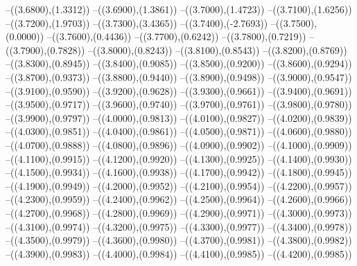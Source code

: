 {	--({\sx*(3.6800)},{\sy*(1.3312)})
	--({\sx*(3.6900)},{\sy*(1.3861)})
	--({\sx*(3.7000)},{\sy*(1.4723)})
	--({\sx*(3.7100)},{\sy*(1.6256)})
	--({\sx*(3.7200)},{\sy*(1.9703)})
	--({\sx*(3.7300)},{\sy*(3.4365)})
	--({\sx*(3.7400)},{\sy*(-2.7693)})
	--({\sx*(3.7500)},{\sy*(0.0000)})
	--({\sx*(3.7600)},{\sy*(0.4436)})
	--({\sx*(3.7700)},{\sy*(0.6242)})
	--({\sx*(3.7800)},{\sy*(0.7219)})
	--({\sx*(3.7900)},{\sy*(0.7828)})
	--({\sx*(3.8000)},{\sy*(0.8243)})
	--({\sx*(3.8100)},{\sy*(0.8543)})
	--({\sx*(3.8200)},{\sy*(0.8769)})
	--({\sx*(3.8300)},{\sy*(0.8945)})
	--({\sx*(3.8400)},{\sy*(0.9085)})
	--({\sx*(3.8500)},{\sy*(0.9200)})
	--({\sx*(3.8600)},{\sy*(0.9294)})
	--({\sx*(3.8700)},{\sy*(0.9373)})
	--({\sx*(3.8800)},{\sy*(0.9440)})
	--({\sx*(3.8900)},{\sy*(0.9498)})
	--({\sx*(3.9000)},{\sy*(0.9547)})
	--({\sx*(3.9100)},{\sy*(0.9590)})
	--({\sx*(3.9200)},{\sy*(0.9628)})
	--({\sx*(3.9300)},{\sy*(0.9661)})
	--({\sx*(3.9400)},{\sy*(0.9691)})
	--({\sx*(3.9500)},{\sy*(0.9717)})
	--({\sx*(3.9600)},{\sy*(0.9740)})
	--({\sx*(3.9700)},{\sy*(0.9761)})
	--({\sx*(3.9800)},{\sy*(0.9780)})
	--({\sx*(3.9900)},{\sy*(0.9797)})
	--({\sx*(4.0000)},{\sy*(0.9813)})
	--({\sx*(4.0100)},{\sy*(0.9827)})
	--({\sx*(4.0200)},{\sy*(0.9839)})
	--({\sx*(4.0300)},{\sy*(0.9851)})
	--({\sx*(4.0400)},{\sy*(0.9861)})
	--({\sx*(4.0500)},{\sy*(0.9871)})
	--({\sx*(4.0600)},{\sy*(0.9880)})
	--({\sx*(4.0700)},{\sy*(0.9888)})
	--({\sx*(4.0800)},{\sy*(0.9896)})
	--({\sx*(4.0900)},{\sy*(0.9902)})
	--({\sx*(4.1000)},{\sy*(0.9909)})
	--({\sx*(4.1100)},{\sy*(0.9915)})
	--({\sx*(4.1200)},{\sy*(0.9920)})
	--({\sx*(4.1300)},{\sy*(0.9925)})
	--({\sx*(4.1400)},{\sy*(0.9930)})
	--({\sx*(4.1500)},{\sy*(0.9934)})
	--({\sx*(4.1600)},{\sy*(0.9938)})
	--({\sx*(4.1700)},{\sy*(0.9942)})
	--({\sx*(4.1800)},{\sy*(0.9945)})
	--({\sx*(4.1900)},{\sy*(0.9949)})
	--({\sx*(4.2000)},{\sy*(0.9952)})
	--({\sx*(4.2100)},{\sy*(0.9954)})
	--({\sx*(4.2200)},{\sy*(0.9957)})
	--({\sx*(4.2300)},{\sy*(0.9959)})
	--({\sx*(4.2400)},{\sy*(0.9962)})
	--({\sx*(4.2500)},{\sy*(0.9964)})
	--({\sx*(4.2600)},{\sy*(0.9966)})
	--({\sx*(4.2700)},{\sy*(0.9968)})
	--({\sx*(4.2800)},{\sy*(0.9969)})
	--({\sx*(4.2900)},{\sy*(0.9971)})
	--({\sx*(4.3000)},{\sy*(0.9973)})
	--({\sx*(4.3100)},{\sy*(0.9974)})
	--({\sx*(4.3200)},{\sy*(0.9975)})
	--({\sx*(4.3300)},{\sy*(0.9977)})
	--({\sx*(4.3400)},{\sy*(0.9978)})
	--({\sx*(4.3500)},{\sy*(0.9979)})
	--({\sx*(4.3600)},{\sy*(0.9980)})
	--({\sx*(4.3700)},{\sy*(0.9981)})
	--({\sx*(4.3800)},{\sy*(0.9982)})
	--({\sx*(4.3900)},{\sy*(0.9983)})
	--({\sx*(4.4000)},{\sy*(0.9984)})
	--({\sx*(4.4100)},{\sy*(0.9985)})
	--({\sx*(4.4200)},{\sy*(0.9985)})
}
